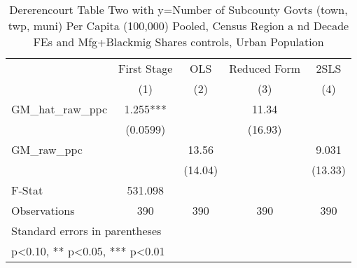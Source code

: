 \begin{table}[htbp]\centering
\def\sym#1{\ifmmode^{#1}\else\(^{#1}\)\fi}
\caption{Dererencourt Table Two with y=Number of Subcounty Govts (town, twp, muni) Per Capita (100,000) Pooled, Census Region a nd Decade FEs and Mfg+Blackmig Shares controls, Urban Population}
\begin{tabular}{l*{4}{c}}
\toprule
                    & First Stage   &         OLS   &Reduced Form   &        2SLS   \\
                    &\multicolumn{1}{c}{(1)}   &\multicolumn{1}{c}{(2)}   &\multicolumn{1}{c}{(3)}   &\multicolumn{1}{c}{(4)}   \\
\midrule
GM\_hat\_raw\_ppc      &       1.255***&               &       11.34   &               \\
                    &    (0.0599)   &               &     (16.93)   &               \\
\addlinespace
GM\_raw\_ppc          &               &       13.56   &               &       9.031   \\
                    &               &     (14.04)   &               &     (13.33)   \\
\midrule
F-Stat              &     531.098   &               &               &               \\
Observations        &         390   &         390   &         390   &         390   \\
\bottomrule
\multicolumn{5}{l}{\footnotesize Standard errors in parentheses}\\
\multicolumn{5}{l}{\footnotesize * p<0.10, ** p<0.05, *** p<0.01}\\
\end{tabular}
\end{table}
